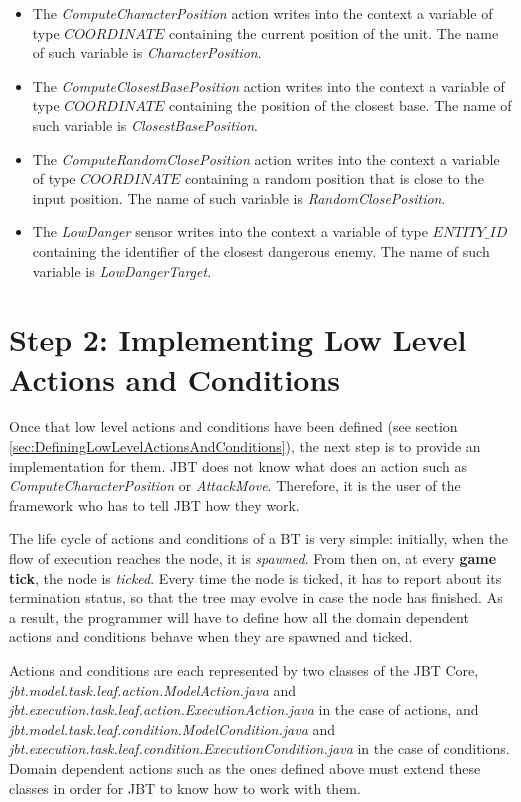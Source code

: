 \documentclass[a4paper]{article}
\begin{document}
\begin{itemize}
  \item The \textit{ComputeCharacterPosition} action writes into the context a variable of type $COORDINATE$ containing the current position of the unit. The name of such variable is \textit{CharacterPosition}.
  \item The \textit{ComputeClosestBasePosition} action writes into the context a variable of type $COORDINATE$ containing the position of the closest base. The name of such variable is \textit{ClosestBasePosition}.
  \item The \textit{ComputeRandomClosePosition} action writes into the context a variable of type $COORDINATE$ containing a random position that is close to the input position. The name of such variable is \textit{RandomClosePosition}.
  \item The \textit{LowDanger} sensor writes into the context a variable of type $ENTITY\_ID$ containing the identifier of the closest dangerous enemy. The name of such variable is \textit{LowDangerTarget}.
\end{itemize}

\section{Step 2: Implementing Low Level Actions and Conditions}\label{sec:ImplementingLowLevelActionsAndConditions}

Once that low level actions and conditions have been defined (see section \ref{sec:DefiningLowLevelActionsAndConditions}), the next step is to provide an implementation for them. JBT does not know what does an action such as \textit{ComputeCharacterPosition} or \textit{AttackMove}. Therefore, it is the user of the framework who has to tell JBT how they work.

The life cycle of actions and conditions of a BT is very simple: initially, when the flow of execution reaches the node, it is \textit{spawned}. From then on, at every \textbf{game tick}, the node is \textit{ticked}. Every time the node is ticked, it has to report about its termination status, so that the tree may evolve in case the node has finished. As a result, the programmer will have to define how all the domain dependent actions and conditions behave when they are spawned and ticked.

Actions and conditions are each represented by two classes of the JBT Core, \textit{jbt.model.task.leaf.action.ModelAction.java} and \textit{jbt.execution.task.leaf.action.ExecutionAction.java} in the case of actions, and \textit{jbt.model.task.leaf.condition.ModelCondition.java} and \textit{jbt.execution.task.leaf.condition.ExecutionCondition.java} in the case of conditions. Domain dependent actions such as the ones defined above must extend these classes in order for JBT to know how to work with them.
\end{document}
